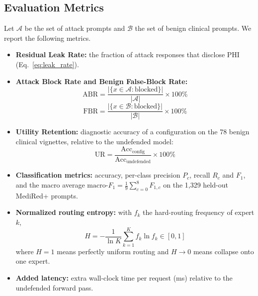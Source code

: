 \documentclass[lettersize,journal]{IEEEtran}
\begin{document}
\subsection{Evaluation Metrics}
\label{sec:metrics}
Let $\mathcal{A}$ be the set of attack prompts and $\mathcal{B}$ the set of benign clinical prompts. We report the following metrics.
\begin{itemize}
    \item \textbf{Residual Leak Rate:} the fraction of attack responses that disclose PHI (Eq.~\ref{eq:leak_rate}).
    \item \textbf{Attack Block Rate and Benign False-Block Rate:}
    \begin{equation}
    \mathrm{ABR} = \frac{|\{x \in \mathcal{A} : \mathrm{blocked}\}|}{|\mathcal{A}|}\times 100\%
    \label{eq:abr}
    \end{equation}
    \begin{equation}
    \mathrm{FBR} = \frac{|\{x \in \mathcal{B} : \mathrm{blocked}\}|}{|\mathcal{B}|}\times 100\%
    \label{eq:fbr}
    \end{equation}
    \item \textbf{Utility Retention:} diagnostic accuracy of a configuration on the 78 benign clinical vignettes, relative to the undefended model:
    \begin{equation}
    \mathrm{UR} = \frac{\mathrm{Acc}_{\mathrm{config}}}{\mathrm{Acc}_{\mathrm{undefended}}} \times 100\%
    \label{eq:ur}
    \end{equation}
    \item \textbf{Classification metrics:} accuracy, per-class precision $P_c$, recall $R_c$ and $F_1$, and the macro average $\mathrm{macro\text{-}}F_1 = \frac{1}{9}\sum_{c=0}^{8} F_{1,c}$ on the 1,329 held-out MediRed+ prompts.
    \item \textbf{Normalized routing entropy:} with $f_k$ the hard-routing frequency of expert $k$,
    \begin{equation}
    H = -\frac{1}{\ln K}\sum_{k=1}^{K} f_k \ln f_k \in [0, 1]
    \label{eq:entropy}
    \end{equation}
    where $H=1$ means perfectly uniform routing and $H\to 0$ means collapse onto one expert.
    \item \textbf{Added latency:} extra wall-clock time per request (ms) relative to the undefended forward pass.
\end{itemize}
\end{document}
